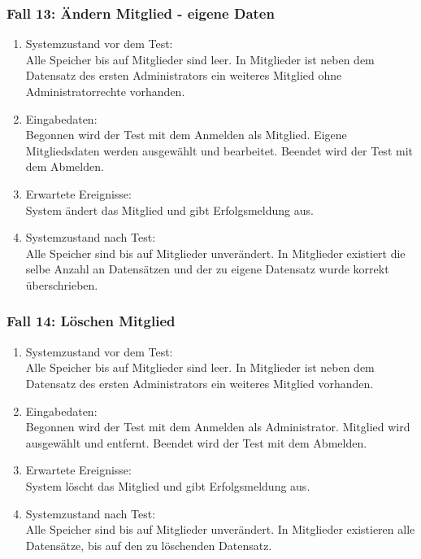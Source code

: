 \subsubsection{Fall 13: Ändern Mitglied - eigene Daten}
\begin{enumerate}
\item Systemzustand vor dem Test:\\
	Alle Speicher bis auf Mitglieder sind leer. In Mitglieder ist neben dem Datensatz des ersten Administrators ein weiteres Mitglied ohne Administratorrechte vorhanden.
\item Eingabedaten:\\
	Begonnen wird der Test mit dem Anmelden als Mitglied. Eigene Mitgliedsdaten werden ausgewählt und bearbeitet. Beendet wird der Test mit dem Abmelden.
\item Erwartete Ereignisse:\\
	System ändert das Mitglied und gibt Erfolgsmeldung aus.
\item Systemzustand nach Test:\\
	Alle Speicher sind bis auf Mitglieder unverändert. In Mitglieder existiert die selbe Anzahl an Datensätzen und der zu eigene Datensatz wurde korrekt überschrieben.
\end{enumerate}

\subsubsection{Fall 14: Löschen Mitglied}
\begin{enumerate}
\item Systemzustand vor dem Test:\\
	Alle Speicher bis auf Mitglieder sind leer. In Mitglieder ist neben dem Datensatz des ersten Administrators ein weiteres Mitglied vorhanden.
\item Eingabedaten:\\
	Begonnen wird der Test mit dem Anmelden als Administrator. Mitglied wird ausgewählt und entfernt. Beendet wird der Test mit dem Abmelden.
\item Erwartete Ereignisse:\\
	System löscht das Mitglied und gibt Erfolgsmeldung aus.
\item Systemzustand nach Test:\\
	Alle Speicher sind bis auf Mitglieder unverändert. In Mitglieder existieren alle Datensätze, bis auf den zu löschenden Datensatz.
\end{enumerate}

